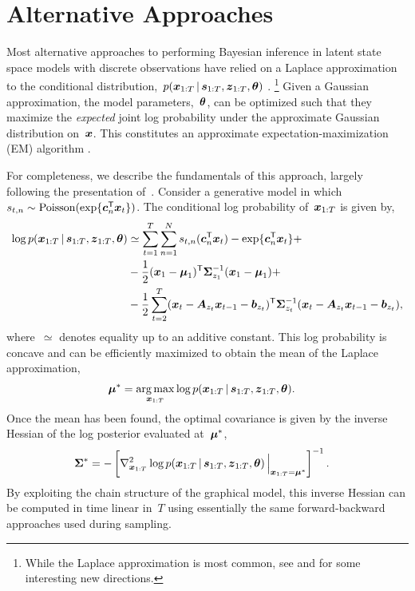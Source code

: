 \section{Alternative Approaches}
Most alternative approaches to performing Bayesian inference in latent
state space models with discrete observations have relied on a Laplace
approximation \citep{tierney1986accurate} to the conditional
distribution,~${p(\boldsymbol{x}_{1:T} \,|\, \boldsymbol{s}_{1:T}, \boldsymbol{z}_{1:T}, \boldsymbol{\theta})}$
\citep{Smith-2003, paninski2010new, macke2011empirical}.
\footnote{While the Laplace approximation is most common, see
  \citet{buesing2012spectral} and \citet{pfau2013robust} for some
  interesting new directions.}  Given a Gaussian approximation, the
model parameters,~$\boldsymbol{\theta}$, can be optimized such that they maximize
the \emph{expected} joint log probability under the approximate
Gaussian distribution on~$\boldsymbol{x}$. This constitutes an approximate
expectation-maximization (EM) algorithm \citep{dempster1977maximum}.

\sloppy
For completeness, we describe the fundamentals of this approach,
largely following the presentation of~\citet{macke2011empirical}.
Consider a generative model in which~${s_{t,n} \sim \mathrm{Poisson}(\exp\{\boldsymbol{c}_n^{\mathsf{T}} \boldsymbol{x}_t\})}$.  The conditional log probability of~$\boldsymbol{x}_{1:T}$ is
given by,
\begin{align*}
  \log p(\boldsymbol{x}_{1:T} \,|\, \boldsymbol{s}_{1:T}, \boldsymbol{z}_{1:T}, \boldsymbol{\theta})
  &\simeq \sum_{t=1}^T \sum_{n=1}^N s_{t,n} (\boldsymbol{c}_{n}^{\mathsf{T}} \boldsymbol{x}_{t}) - \exp\{\boldsymbol{c}_n^{\mathsf{T}}\boldsymbol{x}_{t}\} + \\
  &-\frac{1}{2} (\boldsymbol{x}_1 - \boldsymbol{\mu}_1)^{\mathsf{T}} \boldsymbol{\Sigma}_{z_1}^{-1} (\boldsymbol{x}_1 - \boldsymbol{\mu}_1) + \\
  &-\frac{1}{2} \sum_{t=2}^T (\boldsymbol{x}_t - \boldsymbol{A}_{z_t} \boldsymbol{x}_{t-1} - \boldsymbol{b}_{z_t})^{\mathsf{T}}
  \boldsymbol{\Sigma}_{z_t}^{-1} (\boldsymbol{x}_t - \boldsymbol{A}_{z_t} \boldsymbol{x}_{t-1} - \boldsymbol{b}_{z_t}),
\end{align*}
where~$\simeq$ denotes equality up to an additive constant.
This log probability is concave and can be efficiently maximized to
obtain the mean of the Laplace approximation,
\begin{align*}
  \bmu^* &= \argmax_{\bx_{1:T}}
  \log p(\bx_{1:T} \given \bs_{1:T}, \bz_{1:T}, \btheta).
\end{align*}
Once the mean has been found, the optimal covariance is given by
the inverse Hessian of the log posterior evaluated at~$\boldsymbol{\mu}^*$,
\begin{align*}
  \boldsymbol{\Sigma}^* &= - \left[ \nabla^2_{\boldsymbol{x}_{1:T}}
      \log p(\boldsymbol{x}_{1:T} \,|\, \boldsymbol{s}_{1:T}, \boldsymbol{z}_{1:T}, \boldsymbol{\theta}) \, \Big|_{\boldsymbol{x}_{1:T}=\boldsymbol{\mu}^*} \right]^{-1}.
\end{align*}
By exploiting the chain structure of the graphical model, this
inverse Hessian can be computed in time linear in~$T$ using essentially
the same forward-backward approaches used during sampling.

